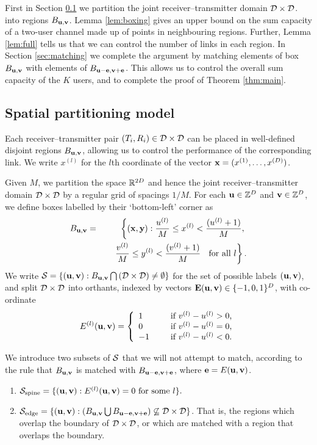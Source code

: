 \documentclass[journal]{IEEEtran}
\begin{document}
First in Section \ref{sec:spatial} we partition the joint
receiver--transmitter domain ${\mathcal{D}} \times {\mathcal{D}}$. 
into regions $B_{{\mathbf{ u}},{\mathbf{ v}}}$.   Lemma \ref{lem:boxing} gives
an upper bound on the sum capacity of a two-user channel made up of points
in neighbouring regions.
Further, Lemma \ref{lem:full}
tells us that we can control the number of 
links in each region.
In Section \ref{sec:matching} we complete the argument by
matching elements of box $B_{{\mathbf{ u}},{\mathbf{ v}}}$ with elements of $B_{{\mathbf{ u-e}},{\mathbf{ v+e}}}$.
This allows us to control the overall sum capacity of the $K$ users, and 
to complete the proof of Theorem \ref{thm:main}. 
%
\subsection{Spatial partitioning model} \label{sec:spatial}
%
Each receiver--transmitter pair $(T_i,R_i) \in
{\mathcal{D}} \times {\mathcal{D}}$ can
be placed in well-defined disjoint regions $B_{{\mathbf{ u}},{\mathbf{ v}}}$, allowing us to control the
performance of the corresponding link.
We write $x^{(l)}$ for the $l$th coordinate of the vector ${\mathbf{ x}} =
(x^{(1)}, \ldots, x^{(D)})$.
%
\begin{definition}
Given $M$, we partition the space ${\mathbb {R}}^{2D}$ and hence the 
joint receiver--transmitter domain ${\mathcal{D}} \times {\mathcal{D}}$ 
by a regular grid of spacings $1/M$.
For each ${\mathbf{ u}} \in {\mathbb {Z}}^{D}$ and  ${\mathbf{ v}} \in {\mathbb {Z}}^{D}$, 
we define boxes labelled by their `bottom-left' corner as
\begin{eqnarray} \label{eq:boxdef}
B_{{\mathbf{ u}},{\mathbf{ v}}} & = & \left\{ ({\mathbf{ x}},{\mathbf{ y}}):   
\frac{u^{(l)}}{M} \leq x^{(l)} < \frac{(u^{(l)} +1)}{M}, \right. \nonumber \\
& & \left. \;\;\;\;
\frac{v^{(l)}}{M} \leq y^{(l)} < \frac{(v^{(l)} +1)}{M} \mbox{ \; for all $l$} \right\}.
\end{eqnarray} 
We write ${\mathcal{S}} = \{ ({\mathbf{ u}},{\mathbf{ v}}):  B_{{\mathbf{ u}},{\mathbf{ v}}} \bigcap \left( {\mathcal{D}} \times {\mathcal{D}}  \right)
\neq \emptyset \}$ for the set
of possible labels $({\mathbf{ u}},{\mathbf{ v}})$, and
split ${\mathcal{D}} \times {\mathcal{D}}$ into orthants, indexed by vectors ${\mathbf{ E}}
({\mathbf{ u}},{\mathbf{ v}})
\in \{-1, 0, 1 \}^D$, with co-ordinate 
$$ E^{(l)}({\mathbf{ u}},{\mathbf{ v}}) = \left\{ \begin{array}{ll}
1 & \mbox{ \;\;\; if $v^{(l)} - u^{(l)} > 0$,} \\
0 & \mbox{ \;\;\; if $v^{(l)} - u^{(l)} = 0$,} \\
-1 & \mbox{ \;\;\; if $v^{(l)} - u^{(l)} < 0$.} \\
\end{array} \right.$$

We introduce two subsets of ${\mathcal{S}}$ that we will not 
attempt to match, according to the rule that $B_{{\mathbf{ u}},{\mathbf{ v}}}$ is matched with 
$B_{{\mathbf{ u-e}},{\mathbf{ v+e}}}$, where 
${\mathbf{ e}} = E({\mathbf{ u}},{\mathbf{ v}})$.
\begin{enumerate}
\item ${\mathcal{S}}_{\rm spine} =
\{ ({\mathbf{ u}},{\mathbf{ v}}): E^{(l)}({\mathbf{ u}},{\mathbf{ v}}) = 0 \mbox{ for some
$l$} \}.$
\item ${\mathcal{S}}_{\rm edge} = \{ ({\mathbf{ u}},{\mathbf{ v}}): \left(B_{{\mathbf{ u}},{\mathbf{ v}}} \bigcup B_{{\mathbf{ u-e}},{\mathbf{ v+e}}}
\right) \not\subseteq {\mathcal{D}} \times {\mathcal{D}}
 \}$. That is, the regions which overlap the boundary of ${\mathcal{D}} \times {\mathcal{D}}$, or which are matched with a
 region that overlaps the boundary.
\end{enumerate}
%
\end{definition}
\end{document}
